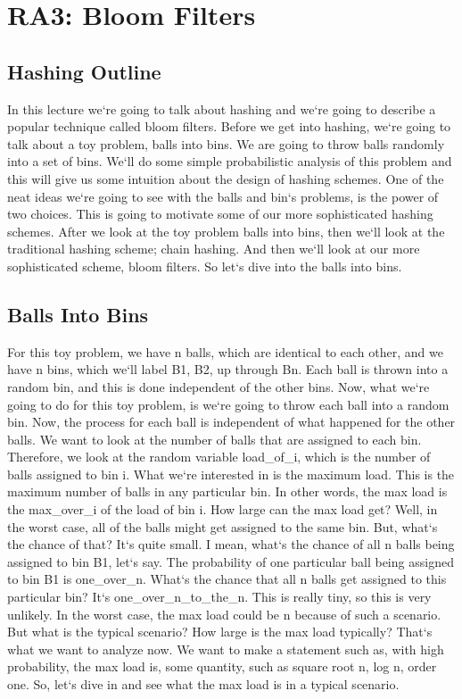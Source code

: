 \section{RA3: Bloom Filters}

\subsection{Hashing Outline}
In this lecture we`re going to talk about hashing and we`re going to describe a popular technique called bloom filters.
Before we get into hashing, we`re going to talk about a toy problem, balls into bins.
We are going to throw balls randomly into a set of bins.
We`ll do some simple probabilistic analysis of this problem and this will give us some intuition about the design of hashing schemes.
One of the neat ideas we`re going to see with the balls and bin`s problems, is the power of two choices.
This is going to motivate some of our more sophisticated hashing schemes.
After we look at the toy problem balls into bins, then we`ll look at the traditional hashing scheme; chain hashing.
And then we`ll look at our more sophisticated scheme, bloom filters.
So let`s dive into the balls into bins.

\subsection{Balls Into Bins}
For this toy problem, we have n balls, which are identical to each other, and we have n bins, which we`ll label B1, B2, up through Bn.
Each ball is thrown into a random bin, and this is done independent of the other bins.
Now, what we`re going to do for this toy problem, is we`re going to throw each ball into a random bin.
Now, the process for each ball is independent of what happened for the other balls.
We want to look at the number of balls that are assigned to each bin.
Therefore, we look at the random variable load\_of\_i, which is the number of balls assigned to bin i.
What we`re interested in is the maximum load.
This is the maximum number of balls in any particular bin.
In other words, the max load is the max\_over\_i of the load of bin i.
How large can the max load get? Well, in the worst case, all of the balls might get assigned to the same bin.
But, what`s the chance of that? It`s quite small.
I mean, what`s the chance of all n balls being assigned to bin B1, let`s say.
The probability of one particular ball being assigned to bin B1 is one\_over\_n.
What`s the chance that all n balls get assigned to this particular bin? It`s one\_over\_n\_to\_the\_n.
This is really tiny, so this is very unlikely.
In the worst case, the max load could be n because of such a scenario.
But what is the typical scenario? How large is the max load typically? That`s what we want to analyze now.
We want to make a statement such as, with high probability, the max load is, some quantity, such as square root n, log n, order one.
So, let`s dive in and see what the max load is in a typical scenario.

